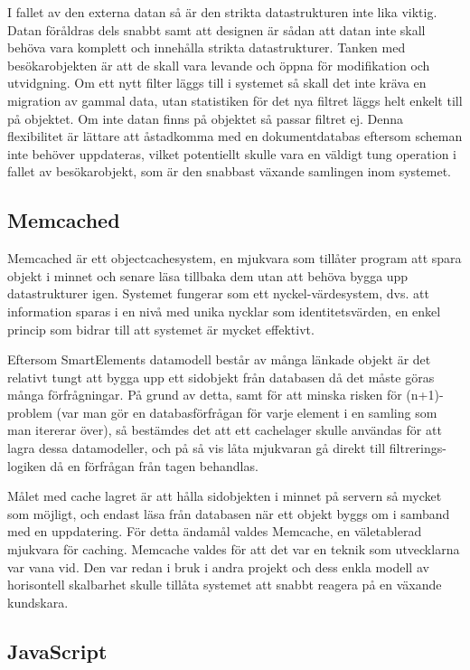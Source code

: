 I fallet av den externa datan så är den strikta datastrukturen inte lika viktig. Datan föråldras dels snabbt samt att designen är sådan att datan inte skall behöva vara komplett och innehålla strikta datastrukturer. Tanken med besökarobjekten är att de skall vara levande och öppna för modifikation och utvidgning. Om ett nytt filter läggs till i systemet så skall det inte kräva en migration av gammal data, utan statistiken för det nya filtret läggs helt enkelt till på objektet. Om inte datan finns på objektet så passar filtret ej. Denna flexibilitet är lättare att åstadkomma med en dokumentdatabas eftersom scheman inte behöver uppdateras, vilket potentiellt skulle vara en väldigt tung operation i fallet av besökarobjekt, som är den snabbast växande samlingen inom systemet.

\subsection{Memcached}

Memcached är ett objectcachesystem, en mjukvara som tillåter program att spara objekt i minnet och senare läsa tillbaka dem utan att behöva bygga upp datastrukturer igen. Systemet fungerar som ett nyckel-värdesystem, dvs. att information sparas i en nivå med unika nycklar som identitetsvärden, en enkel princip som bidrar till att systemet är mycket effektivt. \citep{memcachedwiki}

Eftersom SmartElements datamodell består av många länkade objekt är det relativt tungt att bygga upp ett sidobjekt från databasen då det måste göras många förfrågningar. På grund av detta, samt för att minska risken för (n+1)-problem (var man gör en databasförfrågan för varje element i en samling som man itererar över), så bestämdes det att ett cachelager skulle användas för att lagra dessa datamodeller, och på så vis låta mjukvaran gå direkt till filtrerings-logiken då en förfrågan från tagen behandlas.

Målet med cache lagret är att hålla sidobjekten i minnet på servern så mycket som möjligt, och endast läsa från databasen när ett objekt byggs om i samband med en uppdatering. För detta ändamål valdes Memcache, en väletablerad mjukvara för caching. Memcache valdes för att det var en teknik som utvecklarna var vana vid. Den var redan i bruk i andra projekt och dess enkla modell av horisontell skalbarhet skulle tillåta systemet att snabbt reagera på en växande kundskara.

\subsection{JavaScript}

